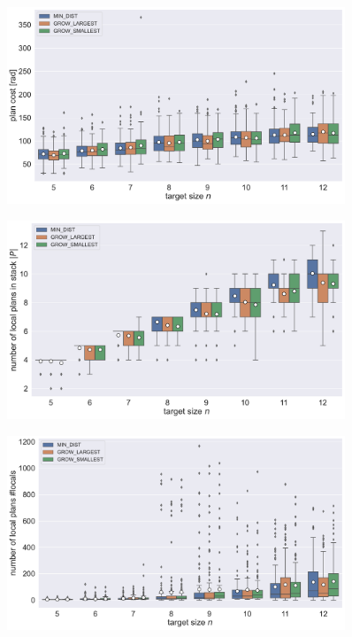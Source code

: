 \begin{figure}
	\centering
	\includegraphics[width=0.9\textwidth]{figures/plots/AFN_cost.pdf}
	\caption[]{}
	\label{fig:AFN_cost}
\end{figure}

\begin{figure}
	\centering
	\includegraphics[width=0.9\textwidth]{figures/plots/AFN_ltg.pdf}
	\caption[]{}
	\label{fig:AFN_ltg}
\end{figure}

\begin{figure}
	\centering
	\includegraphics[width=0.9\textwidth]{figures/plots/AFN_nlocal.pdf}
	\caption[]{}
	\label{fig:AFN_nlocal}
\end{figure}

